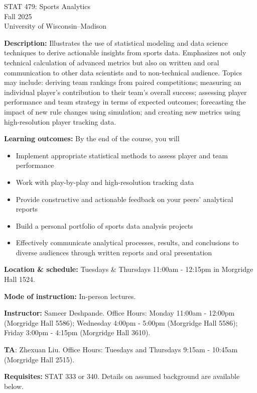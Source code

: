 \documentclass[11pt]{article}
\begin{document}
\begin{center}
\Large{STAT 479: Sports Analytics} \\
\large{Fall 2025} \\
University of Wisconsin--Madison
\end{center}

\singlespacing

\textbf{Description:} Illustrates the use of statistical modeling and data science techniques to derive actionable insights from sports data. Emphasizes not only technical calculation of advanced metrics but also on written and oral communication to other data scientists and to non-technical audience. Topics may include: deriving team rankings from paired competitions; measuring an individual player's contribution to their team's overall success; assessing player performance and team strategy in terms of expected outcomes; forecasting the impact of new rule changes using simulation; and creating new metrics using high-resolution player tracking data.

\textbf{Learning outcomes:} By the end of the course, you will
\begin{itemize}
\item{Implement appropriate statistical methods to assess player and team performance}
\item{Work with play-by-play and high-resolution tracking data}
\item{Provide constructive and actionable feedback on your peers' analytical reports}
\item{Build a personal portfolio of sports data analysis projects}
\item{Effectively communicate analytical processes, results, and conclusions to diverse audiences through written reports and oral presentation} 
\end{itemize}

\textbf{Location \& schedule:} Tuesdays \& Thursdays 11:00am - 12:15pm in Morgridge Hall 1524.

\textbf{Mode of instruction:} In-person lectures.

\textbf{Instructor:} Sameer Deshpande. Office Hours: Monday 11:00am - 12:00pm (Morgridge Hall 5586); Wednesday 4:00pm - 5:00pm (Morgridge Hall 5586); Friday 3:00pm - 4:15pm (Morgridge Hall 3610). 

\textbf{TA}: Zhexuan Liu. Office Hours: Tuesdays and Thursdays 9:15am - 10:45am (Morgridge Hall 2515). 

\textbf{Requisites:} STAT 333 or 340. Details on assumed background are available below.
\end{document}
